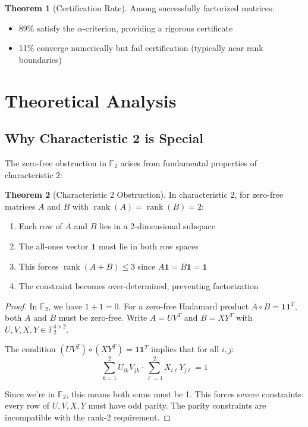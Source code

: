 \documentclass{article}
\theoremstyle{definition}
\newtheorem{theorem}{Theorem}
\DeclareMathOperator{\rank}{rank}
\begin{document}
\begin{theorem}[Certification Rate]
Among successfully factorized matrices:
\begin{itemize}
\item 89\% satisfy the $\alpha$-criterion, providing a rigorous certificate
\item 11\% converge numerically but fail certification (typically near rank boundaries)
\end{itemize}
\end{theorem}

\section{Theoretical Analysis}

\subsection{Why Characteristic 2 is Special}

The zero-free obstruction in $\mathbb{F}_2$ arises from fundamental properties of characteristic 2:

\begin{theorem}[Characteristic 2 Obstruction]
In characteristic 2, for zero-free matrices $A$ and $B$ with $\rank(A) = \rank(B) = 2$:
\begin{enumerate}
\item Each row of $A$ and $B$ lies in a 2-dimensional subspace
\item The all-ones vector $\mathbf{1}$ must lie in both row spaces
\item This forces $\rank(A + B) \leq 3$ since $A\mathbf{1} = B\mathbf{1} = \mathbf{1}$
\item The constraint becomes over-determined, preventing factorization
\end{enumerate}
\end{theorem}

\begin{proof}
In $\mathbb{F}_2$, we have $1 + 1 = 0$. For a zero-free Hadamard product $A \circ B = \mathbf{1}\mathbf{1}^T$, both $A$ and $B$ must be zero-free. Write $A = UV^T$ and $B = XY^T$ with $U,V,X,Y \in \mathbb{F}_2^{4 \times 2}$. 

The condition $(UV^T) \circ (XY^T) = \mathbf{1}\mathbf{1}^T$ implies that for all $i,j$:
\[
\sum_{k=1}^2 U_{ik}V_{jk} \cdot \sum_{\ell=1}^2 X_{i\ell}Y_{j\ell} = 1
\]

Since we're in $\mathbb{F}_2$, this means both sums must be 1. This forces severe constraints: every row of $U,V,X,Y$ must have odd parity. The parity constraints are incompatible with the rank-2 requirement.
\end{proof}
\end{document}
